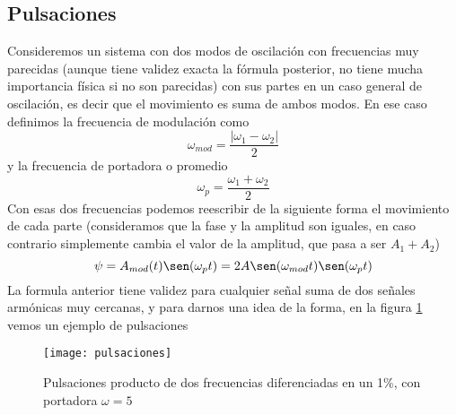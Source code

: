 \documentclass[a4paper]{article}
\numberwithin{equation}{section}
\begin{document}
	\subsection{Pulsaciones}
		Consideremos un sistema con dos modos de oscilación con frecuencias muy parecidas (aunque tiene validez exacta la fórmula posterior, no tiene mucha importancia física si no son parecidas) con sus partes en un caso general de oscilación, es decir que el movimiento es suma de ambos modos. En ese caso definimos la frecuencia de modulación como
		\begin{equation}
			\omega_{mod} = \frac{|\omega_1 - \omega_2|}{2}
			\label{eq:oscilador_pulsaciones_modulacion}
		\end{equation}
		y la frecuencia de portadora o promedio
		\begin{equation}
			\omega_p = \frac{\omega_1 + \omega_2}{2}
			\label{eq:oscilador_pulsaciones_portadora}
		\end{equation}
		Con esas dos frecuencias podemos reescribir de la siguiente forma el movimiento de cada parte (consideramos que la fase y la amplitud son iguales, en caso contrario simplemente cambia el valor de la amplitud, que pasa a ser $A_1 + A_2$)
		\begin{equation}
			\psi = A_{mod}(t) \sen(\omega_p t) = 2 A \sen(\omega_{mod} t) \sen(\omega_p t)
			\label{eq:oscilador_pulsaciones}
		\end{equation}
		La formula anterior tiene validez para cualquier señal suma de dos señales armónicas muy cercanas, y para darnos una idea de la forma, en la figura \ref{fig:pulsaciones} vemos un ejemplo de pulsaciones
		\begin{figure}[H]
			\centering
			\texttt{[image: pulsaciones]}
			\caption{Pulsaciones producto de dos frecuencias diferenciadas en un 1\%, con portadora $\omega = 5$}
			\label{fig:pulsaciones}
		\end{figure}
\end{document}

